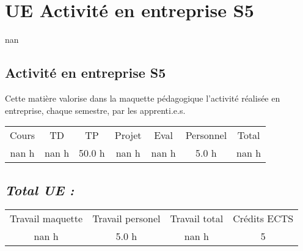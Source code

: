 \section{UE Activité en entreprise S5}%
\label{sec:UEActivitenentrepriseS5}%
nan%
\subsection{Activité en entreprise S5}%
\label{subsec:ActivitenentrepriseS5}%

%
Cette matière valorise dans la maquette pédagogique l'activité réalisée en entreprise, chaque semestre, par les apprenti.e.s.%
\begin{longtable}{c c c c c c c}%
\hline%
Cours&TD&TP&Projet&Eval&Personnel&Total\\%
nan h&nan h&50.0 h&nan h&nan h&5.0 h&nan h\\%
\hline%
\end{longtable}%
\subsection{\textit{Total UE :}}%
\label{subsec:textitTotalUE}%

%
\begin{longtable}{c c c c}%
\hline%
Travail maquette&Travail personel&Travail total&Crédits ECTS\\%
nan h&5.0 h&nan h&5\\%
\hline%
\end{longtable}